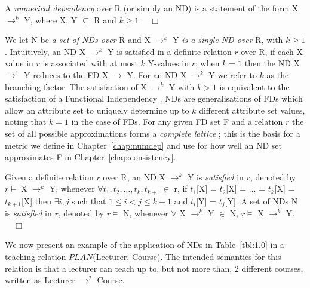 \begin{definition}
\begin{rm}
A {\em numerical dependency} over R (or simply an ND)
is a statement of the form X $\to^k$ Y, where X, Y $\subseteq$ R and
$k \ge 1$.$\quad\Box$ 
\end{rm}
\end{definition}
\smallskip
{}
We let N be {\em a set of NDs over} R and X $\to^k$ Y 
{\em is a single ND over} R, with $k \ge 1$.
Intuitively, an ND X $\to^k$ Y is satisfied in a definite relation $r$ over R,
if each X-value in $r$ is associated with at most $k$ Y-values in $r$;
when $k = 1$ then the ND X $\to^1$ Y reduces to the FD X $\to$ Y. For
an ND X $\to^k$ Y we refer to $k$ as the branching factor. The 
satisfaction of X $\to^k$ Y with $k > 1$ is equivalent to the
satisfaction of a Functional Independency \cite{gl90}.
NDs are generalisations of FDs which
allow an attribute set to uniquely determine up to $k$ different attribute
set values, noting that $k = 1$ in the case of FDs. For any given FD
set F and a relation $r$ the set of all possible approximations forms a
{\em complete lattice} \cite{dp90}; this is the basis for a metric we define
in Chapter~\ref{chap:numdep} and use for how well an ND set
approximates F in Chapter~\ref{chap:consistency}. 


\begin{definition}[Satisfaction of an ND]\label{def:sat-nd}
\begin{rm}
Given a definite relation $r$ over R,
an ND X $\to^k$ Y is {\em satisfied} in $r$,
denoted by $r \models$ X $\to^k$ Y, whenever
$\forall t_1, t_2, \ldots, t_k, t_{k+1} \in$ r, if 
$t_1$[X] = $t_2$[X] = $\ldots$ = $t_k$[X] = $t_{k+1}$[X] then 
$\exists i,j$ such that $1 \le i < j \le k+1$
and $t_i$[Y] = $t_j$[Y].
A set of NDs N is {\em satisfied} in $r$,
denoted by $r \models$ N, whenever
$\forall$ X $\to^k$ Y $\in$ N, $r \models$ X $\to^k$ Y.$\quad\Box$
\end{rm}
\end{definition}

We now present an
example of the application of NDs in Table~\ref{tbl:1.0}  in a
teaching relation $PLAN$(Lecturer, Course).  The intended semantics for
this relation is that a lecturer can teach up to, but not more than, 2
different courses, written as Lecturer $\to^2$ Course.
 
